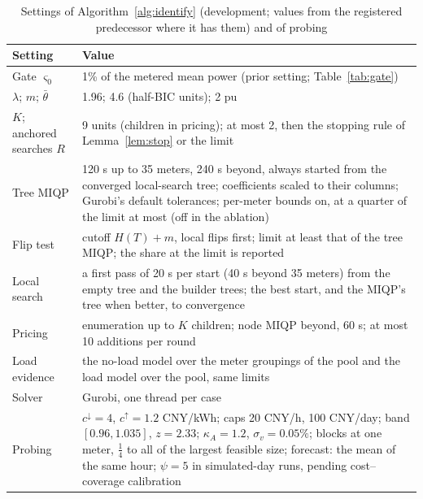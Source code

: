 \documentclass[journal,onecolumn,11pt]{IEEEtran}
\begin{document}
\begin{table}[htbp]
\caption{Settings of Algorithm~\ref{alg:identify} (development; values from the registered predecessor where it has them)
and of probing}\label{tab:settings}
\centering
\begin{tabular}{@{}p{}p{}@{}}
\toprule
Setting & Value\\
\midrule
Gate $\varsigma_0$ & 1\% of the metered mean power (prior setting; Table~\ref{tab:gate})\\
$\lambda$; $m$; $\bar\theta$ & 1.96; 4.6 (half-BIC units); 2 pu\\
$K$; anchored searches $R$ & 9 units (children in pricing); at most 2, then the stopping rule of Lemma~\ref{lem:stop} or the limit\\
Tree MIQP & 120 s up to 35 meters, 240 s beyond, always started from the converged local-search tree; coefficients
scaled to their columns; Gurobi's default tolerances; per-meter bounds on, at a quarter of the limit at most (off in the ablation)\\
Flip test & cutoff $H(T)+m$, local flips first; limit at least that of the tree MIQP; the share at the limit is reported\\
Local search & a first pass of 20 s per start (40 s beyond 35 meters) from the empty tree and the builder trees; the
best start, and the MIQP's tree when better, to convergence\\
Pricing & enumeration up to $K$ children; node MIQP beyond, 60 s; at most 10 additions per round\\
Load evidence & the no-load model over the meter groupings of the pool and the load model over the pool, same limits\\
Solver & Gurobi, one thread per case\\
\midrule
Probing & $c^\downarrow=4$, $c^\uparrow=1.2$ CNY/kWh; caps 20 CNY/h, 100 CNY/day; band $[0.96,1.035]$, $z=2.33$;
$\kappa_A=1.2$, $\sigma_v=0.05\%$; blocks at one meter, $\frac14$ to all of the largest feasible size; forecast: the mean of the
same hour; $\psi=5$ in simulated-day runs, pending cost--coverage calibration\\
\bottomrule
\end{tabular}
\end{table}
\end{document}

